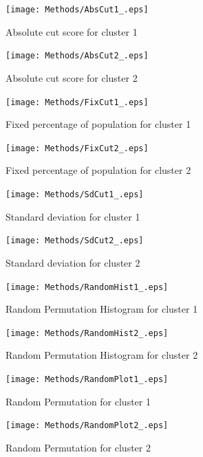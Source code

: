 \begin{figure}[htb]
\centering
\begin{minipage}{0.45\linewidth}
\texttt{[image: Methods/AbsCut1\_.eps]}
\caption{Absolute cut score for cluster 1}
\end{minipage}
\quad
\begin{minipage}{0.45\linewidth}
\texttt{[image: Methods/AbsCut2\_.eps]}
\caption{Absolute cut score for cluster 2}
\end{minipage}
\end{figure}

\begin{figure}[htb]
\centering
\begin{minipage}{0.45\linewidth}
\texttt{[image: Methods/FixCut1\_.eps]}
\caption{Fixed percentage of population for cluster 1}
\end{minipage}
\quad
\begin{minipage}{0.45\linewidth}
\texttt{[image: Methods/FixCut2\_.eps]}
\caption{Fixed percentage of population for cluster 2}
\end{minipage}
\end{figure}
\pagebreak

\begin{figure}[htb]
\centering
\begin{minipage}{0.45\linewidth}
\texttt{[image: Methods/SdCut1\_.eps]}
\caption{Standard deviation for cluster 1}
\end{minipage}
\quad
\begin{minipage}{0.45\linewidth}
\texttt{[image: Methods/SdCut2\_.eps]}
\caption{Standard deviation for cluster 2}
\end{minipage}
\end{figure}

\begin{figure}[htb]
\centering
\begin{minipage}{0.45\linewidth}
\texttt{[image: Methods/RandomHist1\_.eps]}
\caption{Random Permutation Histogram for cluster 1}
\end{minipage}
\quad
\begin{minipage}{0.45\linewidth}
\texttt{[image: Methods/RandomHist2\_.eps]}
\caption{Random Permutation Histogram for cluster 2}
\end{minipage}
\end{figure}
\pagebreak

\begin{figure}[htb]
\centering
\begin{minipage}{0.45\linewidth}
\texttt{[image: Methods/RandomPlot1\_.eps]}
\caption{Random Permutation for cluster 1}
\end{minipage}
\quad
\begin{minipage}{0.45\linewidth}
\texttt{[image: Methods/RandomPlot2\_.eps]}
\caption{Random Permutation for cluster 2}
\end{minipage}
\end{figure}

